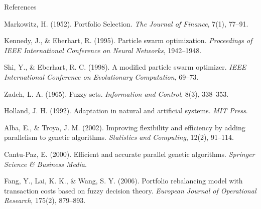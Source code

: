 \documentclass[aspectratio=169,xcolor=table]{beamer}
\begin{document}
\begin{frame}[allowframebreaks]{References}
  \begin{thebibliography}{9}
     Markowitz, H. (1952).
    \newblock Portfolio Selection.
    \newblock \emph{The Journal of Finance}, 7(1), 77--91.
    
     Kennedy, J., \& Eberhart, R. (1995).
    \newblock Particle swarm optimization.
    \newblock \emph{Proceedings of IEEE International Conference on Neural Networks}, 1942--1948.
    
     Shi, Y., \& Eberhart, R. C. (1998).
    \newblock A modified particle swarm optimizer.
    \newblock \emph{IEEE International Conference on Evolutionary Computation}, 69--73.
    
     Zadeh, L. A. (1965).
    \newblock Fuzzy sets.
    \newblock \emph{Information and Control}, 8(3), 338--353.
    
     Holland, J. H. (1992).
    \newblock Adaptation in natural and artificial systems.
    \newblock \emph{MIT Press}.
    
     Alba, E., \& Troya, J. M. (2002).
    \newblock Improving flexibility and efficiency by adding parallelism to genetic algorithms.
    \newblock \emph{Statistics and Computing}, 12(2), 91--114.
    
     Cantu-Paz, E. (2000).
    \newblock Efficient and accurate parallel genetic algorithms.
    \newblock \emph{Springer Science \& Business Media}.
    
     Fang, Y., Lai, K. K., \& Wang, S. Y. (2006).
    \newblock Portfolio rebalancing model with transaction costs based on fuzzy decision theory.
    \newblock \emph{European Journal of Operational Research}, 175(2), 879--893.
  \end{thebibliography}
\end{frame}
\end{document}
